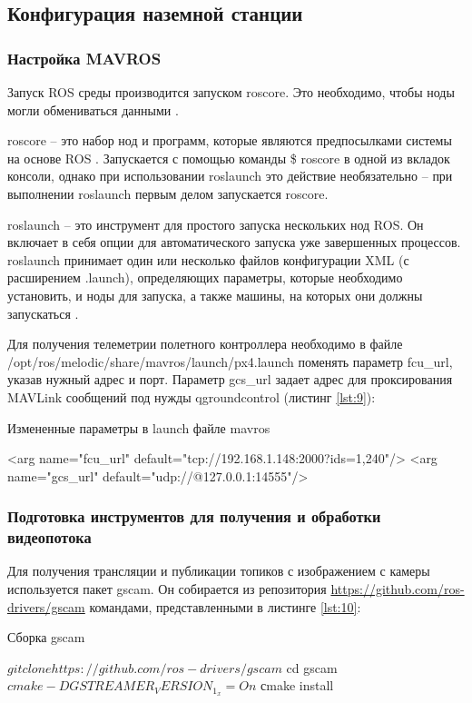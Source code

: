 \subsection{Конфигурация наземной станции}

\subsubsection{Настройка MAVROS}

Запуск ROS среды производится запуском roscore. Это необходимо, чтобы ноды могли обмениваться данными \cite{pkg}.

roscore -- это набор нод и программ, которые являются предпосылками системы на основе ROS \cite{ros}. Запускается с помощью команды \$ roscore в одной из вкладок консоли, однако при использовании roslaunch это действие необязательно -- при выполнении roslaunch первым делом запускается roscore.

roslaunch -- это инструмент для простого запуска нескольких нод ROS. Он включает в себя опции для автоматического запуска уже завершенных процессов. roslaunch принимает один или несколько файлов конфигурации XML (с расширением .launch), определяющих параметры, которые необходимо установить, и ноды для запуска, а также машины, на которых они должны запускаться \cite{ros}.

Для получения телеметрии полетного контроллера необходимо в файле /opt/ros/melodic/share/mavros/launch/px4.launch поменять параметр fcu\_url, указав нужный адрес и порт. Параметр gcs\_url задает адрес для проксирования MAVLink сообщений под нужды qgroundcontrol (листинг \ref{lst:9}):
\begin{Program}[H]
	\caption{Измененные параметры в launch файле mavros} \label{lst:9}
	\begin{MyCode}
	<arg name="fcu_url" default="tcp://192.168.1.148:2000?ids=1,240"/>   
	<arg name="gcs_url" default="udp://@127.0.0.1:14555"/>
	\end{MyCode}
\end{Program}

\subsubsection{Подготовка инструментов для получения и обработки видеопотока}
Для получения трансляции и публикации топиков с изображением с камеры используется пакет gscam. Он собирается из репозитория \url{https://github.com/ros-drivers/gscam} командами, представленными в листинге \ref{lst:10}:
\begin{Program}[H]
	\caption{Сборка gscam} \label{lst:10}
	\begin{MyCode}
	$ git clone https://github.com/ros-drivers/gscam
	$ cd gscam
	$ cmake -DGSTREAMER_VERSION_1_x=On
	$ сmake install
	\end{MyCode}
\end{Program}


